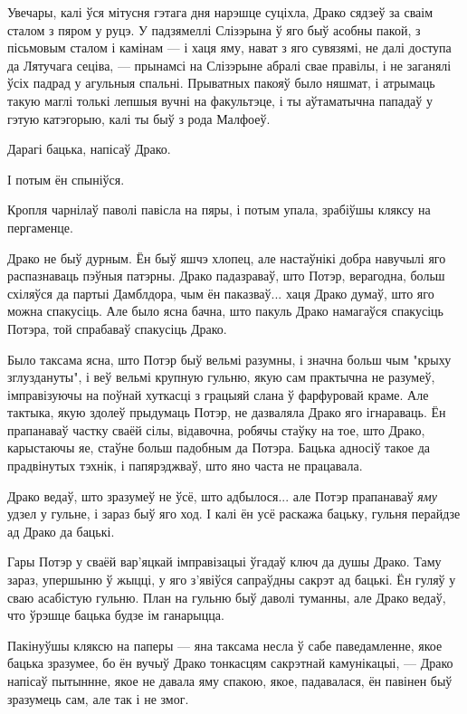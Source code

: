 Увечары, калі ўся мітусня гэтага дня нарэшце суціхла, Драко сядзеў за сваім 
сталом з пяром у руцэ. У падзямеллі Слізэрына ў яго быў асобны пакой, з пісьмовым 
сталом і камінам --- і хаця яму, нават з яго сувязямі, не далі доступа да 
Лятучага сеціва, --- прынамсі на Слізэрыне абралі свае правілы, і не заганялі 
ўсіх падрад у агульныя спальні. Прыватных пакояў было няшмат, і атрымаць такую маглі 
толькі лепшыя вучні на факультэце, і ты аўтаматычна пападаў у гэтую катэгорыю, 
калі ты быў з рода Малфоеў.

{\Large\hpFontCursive Дарагі бацька,} напісаў Драко.

І потым ён спыніўся.

Кропля чарнілаў паволі павісла на пяры, і потым упала, зрабіўшы кляксу на пергаменце.

Драко не быў дурным. Ён быў яшчэ хлопец, але настаўнікі добра навучылі яго 
распазнаваць пэўныя патэрны. Драко падазраваў, што Потэр, верагодна, больш 
схіляўся да партыі Дамблдора, чым ён паказваў... хаця Драко думаў, што яго можна 
спакусіць. Але было ясна бачна, што пакуль Драко намагаўся спакусіць Потэра, той
спрабаваў спакусіць Драко.

Было таксама ясна, што Потэр быў вельмі разумны, і значна больш чым 
"крыху зглуздануты", і веў вельмі крупную гульню, якую сам практычна не разумеў,
імправізуючы на поўнай хуткасці з грацыяй слана ў фарфуровай краме.
Але тактыка, якую 
здолеў прыдумаць Потэр, не дазваляла Драко яго ігнараваць. Ён прапанаваў частку 
сваёй сілы, відавочна, робячы стаўку на тое, што Драко, карыстаючы яе, 
стаўне больш падобным да Потэра. Бацька адносіў такое да прадвінутых тэхнік, і 
папярэджваў, што яно часта не працавала. 

Драко ведаў, што зразумеў не ўсё, што адбылося... але Потэр прапанаваў \emph{яму}
удзел у гульне, і зараз быў яго ход. І калі ён усё раскажа бацьку, гульня
перайдзе ад Драко да бацькі. 

Гары Потэр у сваёй вар'яцкай імправізацыі ўгадаў
ключ да душы Драко. Таму зараз, упершыню ў жыцці, у яго з'явіўся сапраўдны сакрэт ад бацькі.
Ён гуляў у сваю асабістую гульню. План на гульню быў даволі туманны, але Драко
ведаў, что ўрэшце бацька будзе ім ганарыцца.

Пакінуўшы кляксю на паперы --- яна таксама несла ў сабе паведамленне, якое бацька
зразумее, бо ён вучыў Драко тонкасцям сакрэтнай камунікацыі, --- Драко напісаў пытыннне,
якое не давала яму спакою, якое, падавалася, ён павінен быў зразумець сам, але так і не змог.

